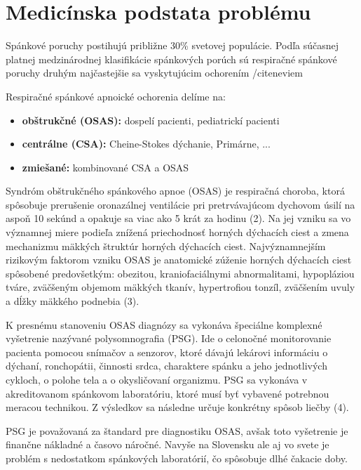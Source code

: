
\chapter{Medicínska podstata problému} \label{kap:Motivacia}

\pagestyle{fancy}
\fancyhf{}
\fancyfoot[CE,CO]{\thepage}

Spánkové poruchy postihujú približne 30\% svetovej populácie. Podľa súčasnej platnej
medzinárodnej klasifikácie spánkových porúch sú respiračné spánkové poruchy druhým
najčastejšie sa vyskytujúcim ochorením /cite{neviem}

Respiračné spánkové apnoické ochorenia delíme na:

\begin{itemize}
	\item \textbf{obštrukčné (OSAS):} dospelí pacienti, pediatrickí pacienti
	\item \textbf{centrálne (CSA):} Cheine-Stokes dýchanie, Primárne, ...
	\item \textbf{zmiešané:} kombinované CSA a OSAS
\end{itemize}

Syndróm obštrukčného spánkového apnoe (OSAS) je respiračná choroba, ktorá spôsobuje
prerušenie oronazálnej ventilácie pri pretrvávajúcom dychovom úsilí na aspoň 10 sekúnd a
opakuje sa viac ako 5 krát za hodinu (2). Na jej vzniku sa vo významnej miere podieľa znížená
priechodnosť horných dýchacích ciest a zmena mechanizmu mäkkých štruktúr horných dýchacích
ciest. Najvýznamnejším rizikovým faktorom vzniku OSAS je anatomické zúženie horných
dýchacích ciest spôsobené predovšetkým: obezitou, kraniofaciálnymi abnormalitami, hypopláziou
tváre, zväčšeným objemom mäkkých tkanív, hypertrofiou tonzíl, zväčšením uvuly a dĺžky
mäkkého podnebia (3).

K presnému stanoveniu OSAS diagnózy sa vykonáva špeciálne komplexné vyšetrenie nazývané
polysomnografia (PSG). Ide o celonočné monitorovanie pacienta pomocou snímačov a senzorov,
ktoré dávajú lekárovi informáciu o dýchaní, ronchopátii, činnosti srdca, charaktere spánku a jeho
jednotlivých cykloch, o polohe tela a o okysličovaní organizmu. PSG sa vykonáva v
akreditovanom spánkovom laboratóriu, ktoré musí byť vybavené potrebnou meracou technikou. Z
výsledkov sa následne určuje konkrétny spôsob liečby (4).

PSG je považovaná za štandard pre diagnostiku OSAS, avšak toto vyšetrenie je finančne
nákladné a časovo náročné. Navyše na Slovensku ale aj vo svete je problém s nedostatkom
spánkových laboratórií, čo spôsobuje dlhé čakacie doby.

